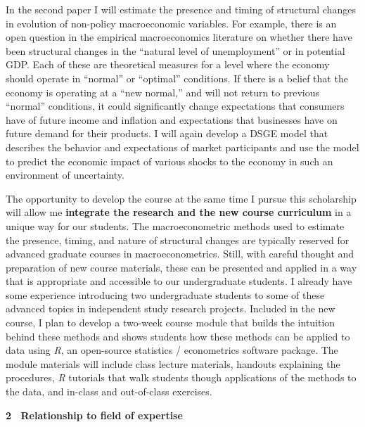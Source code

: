 \documentclass[11pt]{article}
\begin{document}
In the second paper I will estimate the presence and timing of structural changes in evolution of non-policy macroeconomic variables.  For example, there is an open question in the empirical macroeconomics literature on whether there have been structural changes in the ``natural level of unemployment'' or in potential GDP.  Each of these are theoretical measures for a level where the economy should operate in ``normal'' or ``optimal'' conditions.  If there is a belief that the economy is operating at a ``new normal,'' and will not return to previous ``normal'' conditions, it could significantly change expectations that consumers have of future income and inflation and expectations that businesses have on future demand for their products.  I will again develop a DSGE model that describes the behavior and expectations of market participants and use the model to predict the economic impact of various shocks to the economy in such an environment of uncertainty.

The opportunity to develop the course at the same time I pursue this scholarship will allow me \textbf{integrate the research and the new course curriculum} in a unique way for our students.  The macroeconometric methods used to estimate the presence, timing, and nature of structural changes are typically reserved for advanced graduate courses in macroeconometrics.  Still, with careful thought and preparation of new course materials, these can be presented and applied in a way that is appropriate and accessible to our undergraduate students.  I already have some experience introducing two undergraduate students to some of these advanced topics in independent study research projects.  Included in the new course, I plan to develop a two-week course module that builds the intuition behind these methods and shows students how these methods can be applied to data using \textit{R}, an open-source statistics / econometrics software package.  The module materials will include class lecture materials, handouts explaining the procedures, \textit{R} tutorials that walk students though applications of the methods to the data, and in-class and out-of-class exercises.  

\textbf{2~ Relationship to field of expertise}
\end{document}
